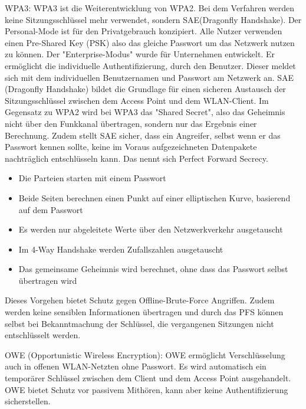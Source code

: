 	WPA3: \newline
	WPA3 ist die Weiterentwicklung von WPA2. Bei dem Verfahren werden keine Sitzungsschlüssel mehr verwendet,
	sondern SAE(Dragonfly Handshake).
	Der Personal-Mode ist für den Privatgebrauch konzipiert. Alle Nutzer verwenden einen Pre-Shared Key (PSK)
	also das gleiche Passwort um das Netzwerk nutzen zu können. Der "Enterprise-Modus" wurde für Unternehmen
	entwickelt. Er ermöglicht die individuelle Authentifizierung, durch den Benutzer. Dieser meldet sich mit dem 
	individuellen Benutzernamen und Passwort am Netzwerk an.
	SAE (Dragonfly Handshake) bildet die Grundlage für einen sicheren Austausch der Sitzungsschlüssel zwischen
	dem Access Point und dem WLAN-Client. Im Gegensatz zu WPA2 wird bei WPA3 das "Shared Secret", also das Geheimnis
	nicht über den Funkkanal übertragen, sondern nur das Ergebnis einer Berechnung. Zudem stellt SAE sicher,
	dass ein Angreifer, selbst wenn er das Passwort kennen sollte, keine im Voraus aufgezeichneten Datenpakete
	nachträglich entschlüsseln kann. Das nennt sich Perfect Forward Secrecy.
	\begin{itemize}
		\item{Die Parteien starten mit einem Passwort}
		\item{Beide Seiten berechnen einen Punkt auf einer elliptischen Kurve, basierend auf dem Passwort}
		\item{Es werden nur abgeleitete Werte über den Netzwerkverkehr ausgetauscht}
		\item{Im 4-Way Handshake werden Zufallszahlen ausgetauscht}
		\item{Das gemeinsame Geheimnis wird berechnet, ohne dass das Passwort selbst übertragen wird}
	\end{itemize}
	Dieses Vorgehen bietet Schutz gegen Offline-Brute-Force Angriffen. Zudem werden keine sensiblen Informationen
	übertragen und durch das PFS können selbst bei Bekanntmachung der Schlüssel, die vergangenen Sitzungen nicht entschlüsselt werden.

	OWE (Opportunistic Wireless Encryption): \newline
	OWE ermöglicht Verschlüsselung auch in offenen WLAN-Netzten ohne Passwort. Es wird automatisch ein temporärer
	Schlüssel zwischen dem Client und dem Access Point ausgehandelt. OWE bietet Schutz vor passivem Mithören, kann
	aber keine Authentifizierung sicherstellen. \cite{frankel2007b, souppaya2012b}

